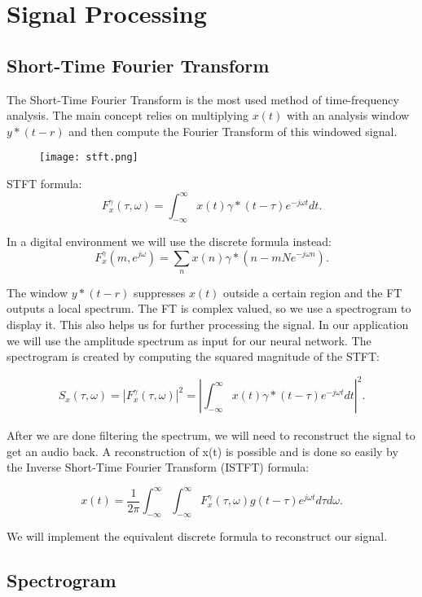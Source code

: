 \documentclass[../Thesis.tex]{subfiles}
\begin{document}
 
\section {Signal Processing}
\subsection {Short-Time Fourier Transform}
The Short-Time Fourier Transform is the most used method of time-frequency analysis. The main concept relies on multiplying $x(t)$ with an analysis window $y*(t-r)$ and then compute the Fourier Transform of this windowed signal.

\begin{figure}[h]
\centering
\texttt{[image: stft.png]}
\end{figure}
 
STFT formula:
\[ F_x^\gamma (\tau, \omega) 
= \int_{-\infty}^{\infty} x(t) \gamma *(t - \tau) e_{}^{-j \omega t} \mathit{d} t .\]
 
In a digital environment we will use the discrete formula instead:
\[ F_x^\gamma (\mathit{m}, e_{}^{j \omega}) 
= \sum_{n} x(n) \gamma *(\mathit{n} - \mathit{mN} e_{}^{-j \omega \mathit{n}}) .\]
 
The window $y*(t-r)$ suppresses $x(t)$ outside a certain region and the FT outputs a local spectrum.
The FT is complex valued, so we use a spectrogram to display it. This also helps us for further processing the signal. In our application we will use the amplitude spectrum as input for our neural network. The spectrogram is created by computing the squared magnitude of the STFT:

\[ {\mathit{S}_x (\tau, \omega)} 
= |F_x^\gamma(\tau, \omega)|_{}^2
= |\int_{-\infty}^{\infty}x(t) \gamma * (t - \tau) e_{}^{-j \omega t} \mathit{d} t|_{}^2 .\]
 
After we are done filtering the spectrum, we will need to reconstruct the signal to get an audio back. A reconstruction of x(t) is possible and is done so easily by the Inverse Short-Time Fourier Transform (ISTFT) formula:

\[ x(t) 
= \frac{1}{2\pi}\int_{-\infty}^{\infty} \int_{-\infty}^{\infty} F_x^\gamma(\tau, \omega) g(t - \tau)e_{}^{j\omega t} {\mathit{d} \tau} {\mathit{d} \omega} .\]
 
We will implement the equivalent discrete formula to reconstruct our signal. 
\subsection {Spectrogram}
\end{document}
